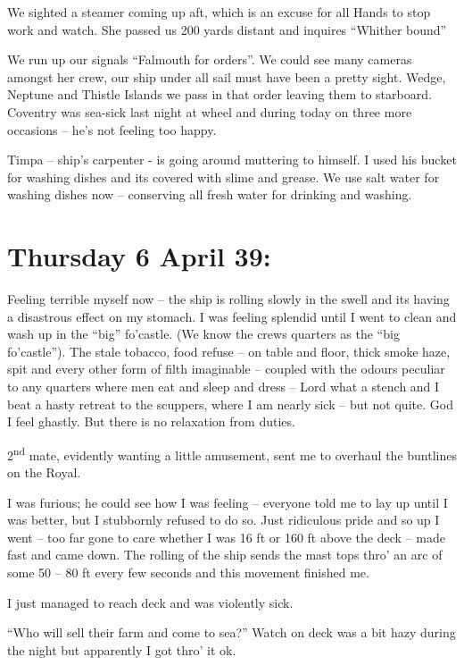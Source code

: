 \documentclass[
  11pt,
  msmallroyalvopaper
]{memoir}
\begin{document}
We sighted a steamer coming up aft, which is an excuse for all Hands to
stop work and watch. She passed us 200 yards distant and inquires
``Whither bound''

We run up our signals ``Falmouth for orders''. We could see many cameras
amongst her crew, our ship under all sail must have been a pretty sight.
Wedge, Neptune and Thistle Islands we pass in that order leaving them to
starboard. Coventry was sea-sick last night at wheel and during today on
three more occasions -- he's not feeling too happy.

Timpa -- ship's carpenter - is going around muttering to himself. I used
his bucket for washing dishes and its covered with slime and grease. We
use salt water for washing dishes now -- conserving all fresh water for
drinking and washing.

\hypertarget{thursday-6-april-39}{%
\section{Thursday 6 April 39:}\label{thursday-6-april-39}}

Feeling terrible myself now -- the ship is rolling slowly in the swell
and its having a disastrous effect on my stomach. I was feeling splendid
until I went to clean and wash up in the ``big'' fo'castle. (We know the
crews quarters as the ``big fo'castle''). The stale tobacco, food refuse
-- on table and floor, thick smoke haze, spit and every other form of
filth imaginable -- coupled with the odours peculiar to any quarters
where men eat and sleep and dress -- Lord what a stench and I beat a
hasty retreat to the scuppers, where I am nearly sick -- but not quite.
God I feel ghastly. But there is no relaxation from duties.

2\textsuperscript{nd} mate, evidently wanting a little amusement, sent
me to overhaul the buntlines on the Royal.

I was furious; he could see how I was feeling -- everyone told me to lay
up until I was better, but I stubbornly refused to do so. Just
ridiculous pride and so up I went -- too far gone to care whether I was
16 ft or 160 ft above the deck -- made fast and came down. The rolling
of the ship sends the mast tops thro' an arc of some 50 -- 80 ft every
few seconds and this movement finished me.

I just managed to reach deck and was violently sick.

``Who will sell their farm and come to sea?'' Watch on deck was a bit
hazy during the night but apparently I got thro' it ok.
\end{document}
